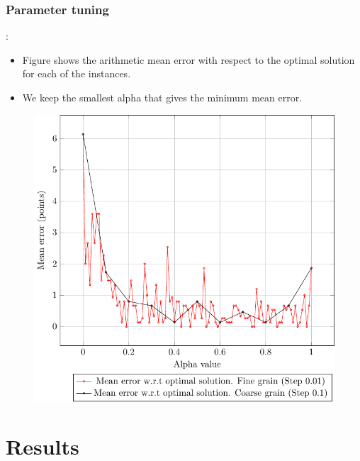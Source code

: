 \documentclass[9pt, aspectratio=169, xcolor=table]{beamer}
\begin{document}
\subsubsection{Parameter tuning}
\begin{frame}{\subsecname: \subsubsecname}

    \begin{minipage}{0.44\textwidth}
	\begin{itemize}
	    \item Figure shows the arithmetic mean error with respect to the optimal solution for each of the instances.
      \item We keep the smallest alpha that gives the minimum mean error.
	\end{itemize}
    \end{minipage}
    \hfill
    \begin{minipage}{0.52\textwidth}
	\centering
	\begin{figure}[H]
	    \centering
	    \includegraphics[width=\linewidth]{../plots/error.pdf}
	    \label{fig:error}
	\end{figure}
    \end{minipage}
\end{frame}

\section{Results}
\end{document}
